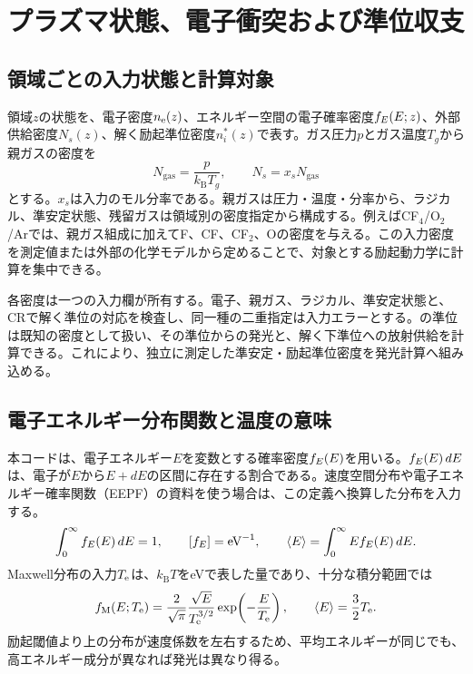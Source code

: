 \section{プラズマ状態、電子衝突および準位収支}
\subsection{領域ごとの入力状態と計算対象}
領域$z$の状態を、電子密度$n_{\mathrm e}(z)$、エネルギー空間の電子確率密度$f_E(E;z)$、外部供給密度$N_s(z)$、解く励起準位密度$n_i^*(z)$で表す。ガス圧力$p$とガス温度$T_g$から親ガスの密度を
\begin{equation}
N_{\mathrm{gas}}=\frac{p}{k_{\mathrm B}T_g},\qquad N_s=x_sN_{\mathrm{gas}}
\label{eq:gas}
\end{equation}
とする。$x_s$は入力のモル分率である。親ガスは圧力・温度・分率から、ラジカル、準安定状態、残留ガスは領域別の密度指定から構成する。例えばCF$_4$/O$_2$/Arでは、親ガス組成に加えてF、CF、CF$_2$、Oの密度を与える。この入力密度を測定値または外部の化学モデルから定めることで、対象とする励起動力学に計算を集中できる。

各密度は一つの入力欄が所有する。電子、親ガス、ラジカル、準安定状態と、CRで解く準位の対応を検査し、同一種の二重指定は入力エラーとする。の準位は既知の密度として扱い、その準位からの発光と、解く下準位への放射供給を計算できる。これにより、独立に測定した準安定・励起準位密度を発光計算へ組み込める。

\subsection{電子エネルギー分布関数と温度の意味}
本コードは、電子エネルギー$E$を変数とする確率密度$f_E(E)$を用いる。$f_E(E)\,dE$は、電子が$E$から$E+dE$の区間に存在する割合である。速度空間分布や電子エネルギー確率関数（EEPF）の資料を使う場合は、この定義へ換算した分布を入力する。
\begin{equation}
\int_0^\infty f_E(E)\,dE=1,\qquad [f_E]=\mathrm{eV}^{-1},\qquad
\langle E\rangle=\int_0^\infty Ef_E(E)\,dE .
\label{eq:pdf}
\end{equation}
Maxwell分布の入力$T_{\mathrm e}$は、$k_{\mathrm B}T$をeVで表した量であり、十分な積分範囲では
\begin{equation}
f_{\mathrm M}(E;T_{\mathrm e})=\frac{2}{\sqrt\pi}\frac{\sqrt E}{T_{\mathrm e}^{3/2}}
\exp\!\left(-\frac{E}{T_{\mathrm e}}\right),\qquad \langle E\rangle=\frac32T_{\mathrm e} .
\label{eq:maxwell}
\end{equation}
励起閾値より上の分布が速度係数を左右するため、平均エネルギーが同じでも、高エネルギー成分が異なれば発光は異なり得る\cite{hagelaar}。

